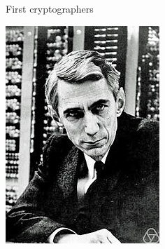 \documentclass{beamer}
\begin{document}
\begin{frame}{First cryptographers}
\begin{center}
\begin{minipage}{0.45\linewidth}
\begin{center}
                \includegraphics[width=0.4\linewidth]{fig/220px-ClaudeShannon_MFO3807.jpg}
            \end{center}
        \end{minipage}            
    \end{center}
\end{frame}
\end{document}
